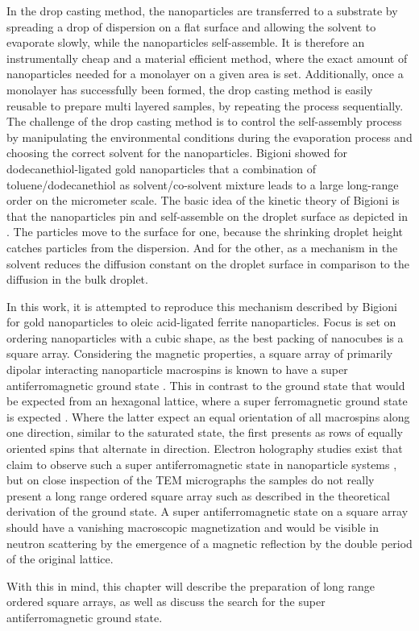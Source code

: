\documentclass[\main/dresen_thesis.tex]{subfiles}
\begin{document}
  In the drop casting method, the nanoparticles are transferred to a substrate by spreading a drop of dispersion on a flat surface and allowing the solvent to evaporate slowly, while the nanoparticles self-assemble.
  It is therefore an instrumentally cheap and a material efficient method, where the exact amount of nanoparticles needed for a monolayer on a given area is set.
  Additionally, once a monolayer has successfully been formed, the drop casting method is easily reusable to prepare multi layered samples, by repeating the process sequentially.
  The challenge of the drop casting method is to control the self-assembly process by manipulating the environmental conditions during the evaporation process and choosing the correct solvent for the nanoparticles.
  Bigioni \etal \cite{Bigioni_2006_Kinet} showed for dodecanethiol-ligated gold nanoparticles that a combination of toluene/dodecanethiol as solvent/co-solvent mixture leads to a large long-range order on the micrometer scale.
  The basic idea of the kinetic theory of Bigioni \etal is that the nanoparticles pin and self-assemble on the droplet surface as depicted in .
  The particles move to the surface for one, because the shrinking droplet height catches particles from the dispersion.
  And for the other, as a mechanism in the solvent reduces the diffusion constant on the droplet surface in comparison to the diffusion in the bulk droplet.

  In this work, it is attempted to reproduce this mechanism described by Bigioni for gold nanoparticles to oleic acid-ligated ferrite nanoparticles.
  Focus is set on ordering nanoparticles with a cubic shape, as the best packing of nanocubes is a square array.
  Considering the magnetic properties, a square array of primarily dipolar interacting nanoparticle macrospins is known to have a super antiferromagnetic ground state \cite{Russier_2001_Calcu}.
  This in contrast to the ground state that would be expected from an hexagonal lattice, where a super ferromagnetic ground state is expected \cite{Russier_2001_Calcu}.
  Where the latter expect an equal orientation of all macrospins along one direction, similar to the saturated state, the first presents as rows of equally oriented spins that alternate in direction.
  Electron holography studies exist that claim to observe such a super antiferromagnetic state in nanoparticle systems \cite{Varon_2013_Dipol}, but on close inspection of the TEM micrographs the samples do not really present a long range ordered square array such as described in the theoretical derivation of the ground state.
  A super antiferromagnetic state on a square array should have a vanishing macroscopic magnetization and would be visible in neutron scattering by the emergence of a magnetic reflection by the double period of the original lattice.

  With this in mind, this chapter will describe the preparation of long range ordered square arrays, as well as discuss the search for the super antiferromagnetic ground state.
\end{document}
